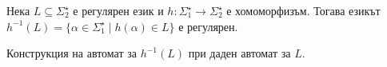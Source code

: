 \begin{problem}
  Нека $L\subseteq \Sigma^\star_2$ е регулярен език и $h:\Sigma^\star_1\to\Sigma^\star_2$ е хомоморфизъм.
  Тогава езикът
  $h^{-1}(L) = \{\alpha \in \Sigma^\star_1 \mid h(\alpha) \in L\}$ е регулярен.  
\end{problem}
\begin{hint}
  Конструкция на автомат за $h^{-1}(L)$ при даден автомат за $L$.
\end{hint}

